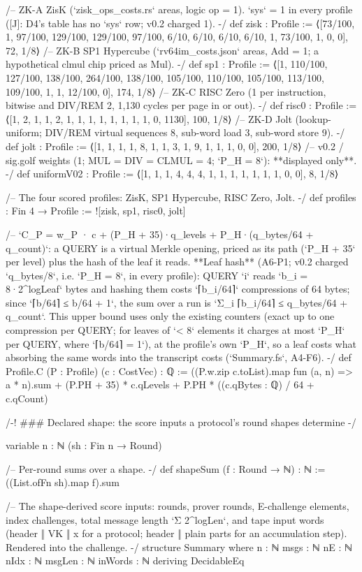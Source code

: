\begin{leancode}[fontsize=\scriptsize,label={\footnotesize Contract/Cost.lean}]
/-- ZK-A ZisK (`zisk_ops_costs.rs` areas, logic op = 1). `sys` = 1 in every profile ([J]: D4's
table has no `sys` row; v0.2 charged 1). -/
def zisk : Profile :=
  ⟨[73/100, 1, 97/100, 129/100, 129/100, 97/100, 6/10, 6/10, 6/10, 6/10, 1, 73/100, 1, 0, 0], 72, 1/8⟩
/-- ZK-B SP1 Hypercube (`rv64im_costs.json` areas, Add = 1; a hypothetical clmul chip priced as Mul). -/
def sp1 : Profile :=
  ⟨[1, 110/100, 127/100, 138/100, 264/100, 138/100, 105/100, 110/100, 105/100, 113/100, 109/100, 1, 1,
    12/100, 0], 174, 1/8⟩
/-- ZK-C RISC Zero (1 per instruction, bitwise and DIV/REM 2, 1,130 cycles per page in or out). -/
def risc0 : Profile := ⟨[1, 2, 1, 1, 2, 1, 1, 1, 1, 1, 1, 1, 1, 0, 1130], 100, 1/8⟩
/-- ZK-D Jolt (lookup-uniform; DIV/REM virtual sequences 8, sub-word load 3, sub-word store 9). -/
def jolt : Profile := ⟨[1, 1, 1, 1, 8, 1, 1, 3, 1, 9, 1, 1, 1, 0, 0], 200, 1/8⟩
/-- v0.2 / sig.golf weights (1; MUL = DIV = CLMUL = 4; `P_H = 8`): **displayed only**. -/
def uniformV02 : Profile := ⟨[1, 1, 1, 4, 4, 4, 1, 1, 1, 1, 1, 1, 1, 0, 0], 8, 1/8⟩

/-- The four scored profiles: ZisK, SP1 Hypercube, RISC Zero, Jolt. -/
def profiles : Fin 4 → Profile := ![zisk, sp1, risc0, jolt]

/-- `C_P = w_P · c + (P_H + 35)·q_levels + P_H·(q_bytes/64 + q_count)`: a QUERY is a virtual
Merkle opening, priced as its path (`P_H + 35` per level) plus the hash of the leaf it reads.
**Leaf hash** (A6-P1; v0.2 charged `q_bytes/8`, i.e. `P_H = 8`, in every profile): QUERY `i` reads
`b_i = 8·2^logLeaf` bytes and hashing them costs `⌈b_i/64⌉` compressions of 64 bytes; since
`⌈b/64⌉ ≤ b/64 + 1`, the sum over a run is `Σ_i ⌈b_i/64⌉ ≤ q_bytes/64 + q_count`. This upper bound
uses only the existing counters (exact up to one compression per QUERY; for leaves of `< 8`
elements it charges at most `P_H` per QUERY, where `⌈b/64⌉ = 1`), at the profile's own `P_H`, so a
leaf costs what absorbing the same words into the transcript costs (`Summary.fs`, A4-F6). -/
def Profile.C (P : Profile) (c : CostVec) : ℚ :=
  ((P.w.zip c.toList).map fun (a, n) => a * n).sum + (P.PH + 35) * c.qLevels +
    P.PH * ((c.qBytes : ℚ) / 64 + c.qCount)

/-! ### Declared shape: the score inputs a protocol's round shapes determine -/

variable {n : ℕ} (sh : Fin n → Round)

/-- Per-round sums over a shape. -/
def shapeSum (f : Round → ℕ) : ℕ := ((List.ofFn sh).map f).sum

/-- The shape-derived score inputs: rounds, prover rounds, E-challenge elements, index
challenges, total message length `Σ 2^logLen`, and tape input words (header ‖ VK ‖ x for a
protocol; header ‖ plain parts for an accumulation step). Rendered into the challenge. -/
structure Summary where
  n : ℕ
  msgs : ℕ
  nE : ℕ
  nIdx : ℕ
  msgLen : ℕ
  inWords : ℕ
  deriving DecidableEq


\end{leancode}
